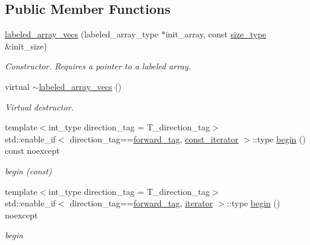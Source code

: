\subsection*{Public Member Functions}
\begin{DoxyCompactItemize}
\item 
\hyperlink{classIceBRG_1_1labeled__array__vecs_a67951d0908cdc5b4b2dea5f56cbed4b8}{labeled\+\_\+array\+\_\+vecs} (labeled\+\_\+array\+\_\+type $\ast$init\+\_\+array, const \hyperlink{classIceBRG_1_1labeled__array__vecs_a9395382460f12145dc0c835e78283fdd}{size\+\_\+type} \&init\+\_\+size)
\begin{DoxyCompactList}\small\item\em Constructor. Requires a pointer to a labeled array. \end{DoxyCompactList}\item 
virtual \hyperlink{classIceBRG_1_1labeled__array__vecs_a689bb4e7c9fad2abfa58a84d36be4974}{$\sim$labeled\+\_\+array\+\_\+vecs} ()
\begin{DoxyCompactList}\small\item\em Virtual destructor. \end{DoxyCompactList}\item 
{\footnotesize template$<$int\+\_\+type direction\+\_\+tag = T\+\_\+direction\+\_\+tag$>$ }\\std\+::enable\+\_\+if$<$ direction\+\_\+tag==\hyperlink{namespaceIceBRG_a3f2c2517005b9902e3eb97894b072f91ac4e94566c20918ca2fe2c7ccdfdec928}{forward\+\_\+tag}, \hyperlink{classIceBRG_1_1labeled__array__vecs_a6003abed56d6f931ce74524cda329972}{const\+\_\+iterator} $>$\+::type \hyperlink{classIceBRG_1_1labeled__array__vecs_a1680867685a6c6efef5da6401a54fe2f}{begin} () const  noexcept
\begin{DoxyCompactList}\small\item\em begin (const) \end{DoxyCompactList}\item 
{\footnotesize template$<$int\+\_\+type direction\+\_\+tag = T\+\_\+direction\+\_\+tag$>$ }\\std\+::enable\+\_\+if$<$ direction\+\_\+tag==\hyperlink{namespaceIceBRG_a3f2c2517005b9902e3eb97894b072f91ac4e94566c20918ca2fe2c7ccdfdec928}{forward\+\_\+tag}, \hyperlink{classIceBRG_1_1labeled__array__vecs_a989cbe0a7bc0b96a206c52ddd3513a23}{iterator} $>$\+::type \hyperlink{classIceBRG_1_1labeled__array__vecs_a2773eae89ddb063f1ae8ff759752a494}{begin} () noexcept
\begin{DoxyCompactList}\small\item\em begin \end{DoxyCompactList}\item 

\end{DoxyCompactItemize}
